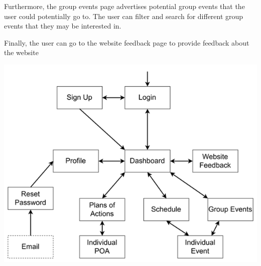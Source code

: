 \documentclass[10pt]{article}
\begin{document}
Furthermore, the group events page advertises potential group events that the
user could potentially go to. The user can filter and search for different group
events that they may be interested in.

Finally, the user can go to the website feedback page to provide feedback about
the website

\includegraphics{Hierarchy}
\end{document}
